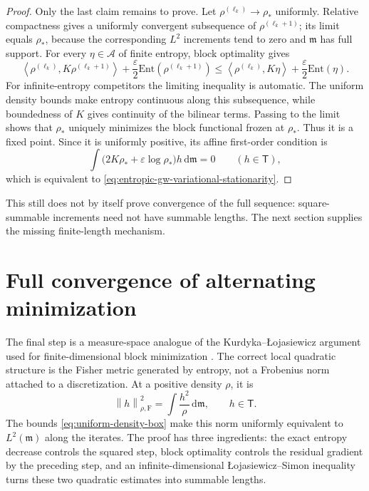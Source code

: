\documentclass[11pt]{article}
\theoremstyle{definition}
\theoremstyle{remark}
\newcommand{\dd}{\,\mathrm d}
\newcommand{\eps}{\varepsilon}
\newcommand{\Ent}{\mathrm{Ent}}
\newcommand{\ip}[2]{\left\langle #1,#2\right\rangle}
\newcommand{\norm}[1]{\left\lVert #1\right\rVert}
\begin{document}
\begin{proof}
Only the last claim remains to prove.  Let
\(\rho^{(\ell_k)}\to\rho_*\) uniformly.  Relative compactness gives a
uniformly convergent subsequence of \(\rho^{(\ell_k+1)}\); its limit equals
\(\rho_*\), because the corresponding \(L^2\) increments tend to zero and
\(\mathfrak m\) has full support.  For every \(\eta\in\mathcal A\) of finite
entropy, block optimality gives
\[
 \ip{\rho^{(\ell_k)}}{K\rho^{(\ell_k+1)}}
 +\frac\eps2\Ent(\rho^{(\ell_k+1)})
 \leq
 \ip{\rho^{(\ell_k)}}{K\eta}
 +\frac\eps2\Ent(\eta).
\]
For infinite-entropy competitors the limiting inequality is automatic.  The
uniform density bounds make entropy continuous along this subsequence,
while boundedness of \(K\) gives continuity of the bilinear terms.  Passing
to the limit shows that \(\rho_*\) uniquely minimizes the block functional
frozen at \(\rho_*\).  Thus it is a fixed point.  Since it is uniformly
positive, its affine first-order condition is
\[
 \int
 \bigl(2K\rho_*+\eps\log\rho_*\bigr)h\dd\mathfrak m=0
 \qquad(h\in\mathsf T),
\]
which is equivalent to
\eqref{eq:entropic-gw-variational-stationarity}.
\end{proof}

This still does not by itself prove convergence of the full sequence:
square-summable increments need not have summable lengths.  The next section
supplies the missing finite-length mechanism.

\section{Full convergence of alternating minimization}
\label{sec:full-alternating-convergence}

The final step is a measure-space analogue of the
Kurdyka--{\L}ojasiewicz argument used for finite-dimensional block
minimization \citep{AttouchBolteRedontSoubeyran2010,XuYin2013}.  The correct
local quadratic structure is the Fisher metric generated by entropy, not a
Frobenius norm attached to a discretization.  At a positive density \(\rho\),
it is
\begin{equation}\label{eq:fisher-tangent-norm}
 \norm{h}_{\rho,\mathrm{F}}^2
 =
 \int\frac{h^2}{\rho}\dd\mathfrak m,
 \qquad h\in\mathsf T.
\end{equation}
The bounds \eqref{eq:uniform-density-box} make this norm uniformly equivalent
to \(L^2(\mathfrak m)\) along the iterates.  The proof has three ingredients:
the exact entropy decrease controls the squared step, block optimality
controls the residual gradient by the preceding step, and an
infinite-dimensional {\L}ojasiewicz--Simon inequality turns these two
quadratic estimates into summable lengths.
\end{document}
